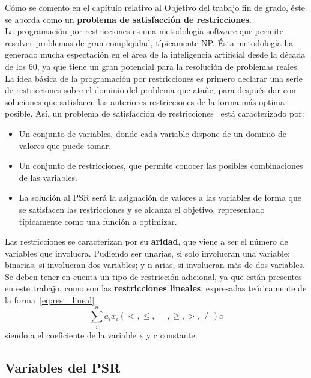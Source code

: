 Cómo se comento en el capítulo relativo al Objetivo del trabajo fin de grado, éste se aborda como un \textbf{problema de satisfacción de restricciones}.\\

La programación por restricciones es una metodología software que permite resolver problemas de gran complejidad, típicamente NP. Ésta metodología ha generado mucha espectación en el área de la inteligencia artificial desde la década de los 60, ya que tiene un gran potencial para la resolución de problemas reales. La idea básica de la programación por restricciones es primero declarar una serie de restricciones sobre el dominio del problema que atañe, para después dar con soluciones que satisfacen las anteriores restricciones de la forma más optima posible. Así, un problema de satisfacción de restricciones~\cite{Russ06} está caracterizado por:
\begin{itemize}
	\item Un conjunto de variables, donde cada variable dispone de un dominio de valores que puede tomar.
	\item Un conjunto de restricciones, que permite conocer las posibles combinaciones de las variables.
	\item La solución al PSR será la asignación de valores a las variables de forma que se satisfacen las restricciones y se alcanza el objetivo, representado típicamente como una función a optimizar.
\end{itemize}
Las restricciones se caracterizan por su \textbf{aridad}, que viene a ser el número de variables que involucra. Pudiendo ser unarias, si solo involucran una variable; binarias, si involucran dos variables; y n-arias, si involucran más de dos variables. Se deben tener en cuenta un tipo de restricción adicional, ya que están presentes en este trabajo, como son las \textbf{restricciones lineales}, expresadas teóricamente de la forma~\ref{eq:rest_lineal}
\begin{equation}
  \label{eq:rest_lineal}
  \sum_{i}^{n} a_{i}x_{i} (<,\leq,=,\geq,>,\neq) c
\end{equation}
siendo a el coeficiente de la variable x y c constante.\\

\subsection{Variables del PSR}

